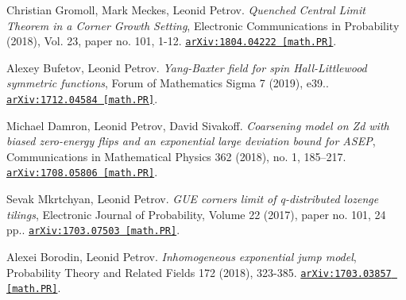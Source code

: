 \begin{etaremune}
\item 
Christian Gromoll, Mark Meckes, Leonid Petrov.
\emph{Quenched Central Limit Theorem in a Corner Growth Setting}, Electronic Communications in Probability (2018), Vol. 23, paper no. 101, 1-12. 
\href{https://arxiv.org/abs/1804.04222}{\texttt{arXiv:1804.04222 [math.PR]}}.













\item 
Alexey Bufetov, Leonid Petrov.
\emph{Yang-Baxter field for spin Hall-Littlewood symmetric functions}, Forum of Mathematics Sigma 7 (2019), e39.. 
\href{https://arxiv.org/abs/1712.04584}{\texttt{arXiv:1712.04584 [math.PR]}}.













\item 
Michael Damron, Leonid Petrov, David Sivakoff.
\emph{Coarsening model on Zd with biased zero-energy flips and an exponential large deviation bound for ASEP}, Communications in Mathematical Physics 362 (2018), no. 1, 185–217. 
\href{https://arxiv.org/abs/1708.05806}{\texttt{arXiv:1708.05806 [math.PR]}}.

















\item 
Sevak Mkrtchyan, Leonid Petrov.
\emph{GUE corners limit of q-distributed lozenge tilings}, Electronic Journal of Probability, Volume 22 (2017), paper no. 101, 24 pp.. 
\href{https://arxiv.org/abs/1703.07503}{\texttt{arXiv:1703.07503 [math.PR]}}.



\item 
Alexei Borodin, Leonid Petrov.
\emph{Inhomogeneous exponential jump model}, Probability Theory and Related Fields 172 (2018), 323-385. 
\href{https://arxiv.org/abs/1703.03857}{\texttt{arXiv:1703.03857 [math.PR]}}.


















\end{etaremune}
